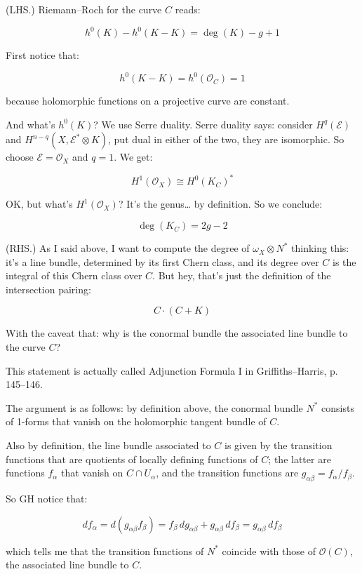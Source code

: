 (LHS.) Riemann–Roch for the curve \( C \) reads:

\[
h^0(K) - h^0(K - K) = \deg(K) - g + 1
\]

First notice that:

\[
h^0(K - K) = h^0(\mathcal{O}_C) = 1
\]

because holomorphic functions on a projective curve are constant.

And what’s \( h^0(K) \)? We use Serre duality. Serre duality says: consider \( H^q(\mathcal{E}) \) and \( H^{n - q}(X, \mathcal{E}^* \otimes K) \), put dual in either of the two, they are isomorphic. So choose \( \mathcal{E} = \mathcal{O}_X \) and \( q = 1 \). We get:

\[
H^1(\mathcal{O}_X) \cong H^0(K_C)^*
\]

OK, but what’s \( H^1(\mathcal{O}_X) \)? It’s the genus… by definition. So we conclude:

\[
\deg(K_C) = 2g - 2
\]

(RHS.) As I said above, I want to compute the degree of \( \omega_X \otimes N^* \) thinking this: it’s a line bundle, determined by its first Chern class, and its degree over \( C \) is the integral of this Chern class over \( C \). But hey, that’s just the definition of the intersection pairing:

\[
C \cdot (C + K)
\]

With the caveat that: why is the conormal bundle the associated line bundle to the curve \( C \)?

This statement is actually called Adjunction Formula I in Griffiths–Harris, p. 145–146.

The argument is as follows: by definition above, the conormal bundle \( N^* \) consists of 1-forms that vanish on the holomorphic tangent bundle of \( C \).

Also by definition, the line bundle associated to \( C \) is given by the transition functions that are quotients of locally defining functions of \( C \); the latter are functions \( f_\alpha \) that vanish on \( C \cap U_\alpha \), and the transition functions are \( g_{\alpha\beta} = f_\alpha / f_\beta \).

So GH notice that:

\[
df_\alpha = d(g_{\alpha\beta} f_\beta) = f_\beta \, dg_{\alpha\beta} + g_{\alpha\beta} \, d f_\beta = g_{\alpha\beta} \, d f_\beta
\]

which tells me that the transition functions of \( N^* \) coincide with those of \( \mathcal{O}(C) \), the associated line bundle to \( C \).

